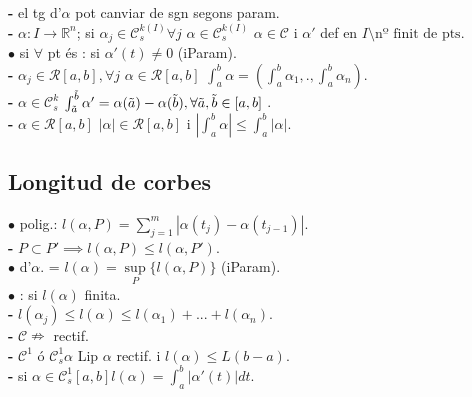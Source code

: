 \documentclass[10pt]{article}
\newcommand{\real}{\mathbb{R}}
\newcommand{\R}{\mathcal{R}}
\newcommand{\C}{\mathscr{C}}
\let\u\relax
\newcommand{\u}[1]{\underline{#1}}
\begin{document}
\begin{multicols}{4}
\textbf{-} el tg d'$\alpha$ pot canviar de sgn segons param.\\
\textbf{-} $\alpha:I\to\real^n$; si $\alpha_j\in\C_{s}^{k(I)} \forall j$ \implies $\alpha\in\C_{s}^{k(I)}$ \implies $\alpha\in\C$ i $\alpha'$ def en $I\setminus\text{nº finit de pts}$.\\
$\bullet$ \u{\textcolor{violet}{$\alpha$ regular}} si $\forall$ pt és \u{\textcolor{violet}{pt regular}}:  si $\alpha'(t)\ne 0$ (iParam).\\
\textbf{-} $\alpha_j\in\R[a,b], \forall j$ \implies $\alpha\in\R[a,b]$ \implies $\int_a^b\alpha = (\int_a^b\alpha_1,.,\int_a^b\alpha_n)$.\\
\textbf{-} $\alpha\in\C_s^k$ \implies $\int_{\Tilde{a}}^{\Tilde{b}} \alpha' = \alpha(\Tilde{a})-\alpha(\Tilde{b}), \forall \Tilde{a}, \Tilde{b} \in [a,b]$ .\\
\textbf{-} $\alpha\in\R[a,b]$ \implies $|\alpha|\in\R[a,b]$ i $|\int_a^b\alpha|\le\int_a^b|\alpha|
$.\\

\subsection*{Longitud de corbes}

$\bullet$ \u{\textcolor{violet}{long.}} polig.: $l(\alpha,P) = \sum\limits_{j=1}^m |\alpha(t_j)-\alpha(t_{j-1})|$.\\
\textbf{-} $P\subset P'\implies l(\alpha,P)\le l(\alpha,P')$.\\
$\bullet$ \u{\textcolor{violet}{long.}} d'$\alpha$. = $l(\alpha) = \sup\limits_P \{l(\alpha,P)\}$ (iParam).\\
$\bullet$ \u{\textcolor{violet}{corba rectificable}}: si $l(\alpha)$ finita.\\
\textbf{-} $l(\alpha_j) \le l(\alpha) \le l(\alpha_1) +...+l(\alpha_n)$.\\
\textbf{-} $\C\nRightarrow$ rectif.\\
\textbf{-} $\C^1$ ó $\C_s^1$\implies $\alpha$ Lip \implies $\alpha$ rectif. i $l(\alpha)\le L(b-a)$.\\
\textbf{-} si $\alpha\in\C_s^1 [a,b]$\implies $l(\alpha) = \int_a^b |\alpha'(t)|dt$.\\


\end{multicols}
\end{document}
